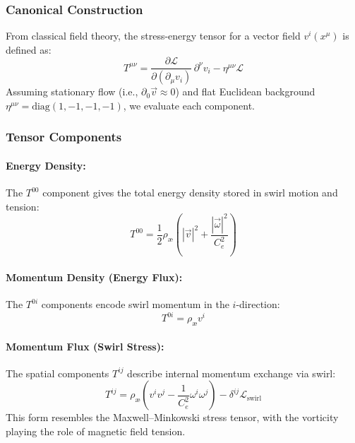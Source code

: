 \documentclass[12pt]{article}
\begin{document}
    \subsubsection*{Canonical Construction}

    From classical field theory, the stress-energy tensor for a vector field \( v^i(x^\mu) \) is defined as:
    \begin{equation}
        T^{\mu\nu} = \frac{\partial \mathcal{L}}{\partial(\partial_\mu v_i)} \, \partial^\nu v_i - \eta^{\mu\nu} \mathcal{L}
    \end{equation}
    Assuming stationary flow (i.e., \( \partial_0 \vec{v} \approx 0 \)) and flat Euclidean background \( \eta^{\mu\nu} = \text{diag}(1, -1, -1, -1) \), we evaluate each component.

    \subsubsection*{Tensor Components}

    \paragraph{Energy Density:} The \( T^{00} \) component gives the total energy density stored in swirl motion and tension:
    \begin{equation}
        T^{00} = \frac{1}{2} \rho_\text{\ae} \left( |\vec{v}|^2 + \frac{|\vec{\omega}|^2}{C_e^2} \right)
    \end{equation}

    \paragraph{Momentum Density (Energy Flux):} The \( T^{0i} \) components encode swirl momentum in the \( i \)-direction:
    \begin{equation}
        T^{0i} = \rho_\text{\ae} v^i
    \end{equation}

    \paragraph{Momentum Flux (Swirl Stress):} The spatial components \( T^{ij} \) describe internal momentum exchange via swirl:
    \begin{equation}
        T^{ij} = \rho_\text{\ae} \left( v^i v^j - \frac{1}{C_e^2} \omega^i \omega^j \right) - \delta^{ij} \mathcal{L}_{\text{swirl}}
    \end{equation}
    This form resembles the Maxwell–Minkowski stress tensor, with the vorticity playing the role of magnetic field tension.
\end{document}
